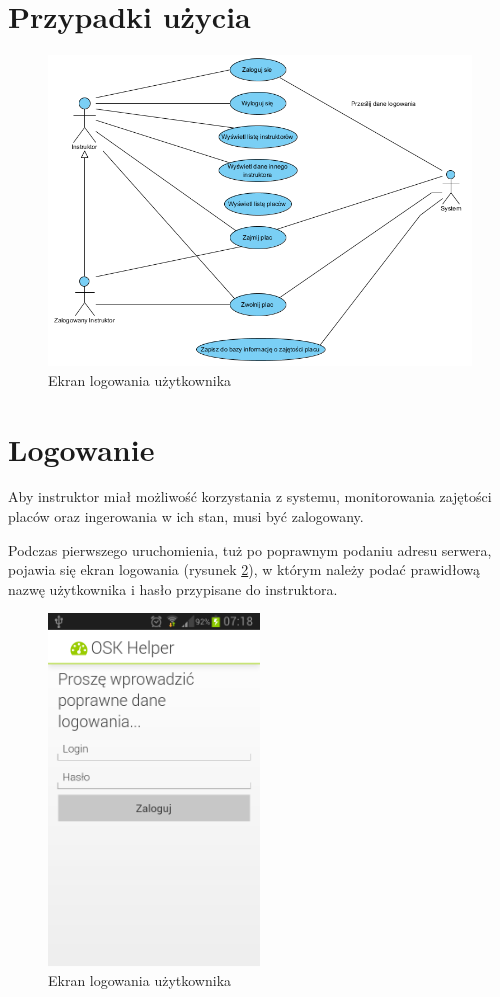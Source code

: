 \documentclass[twoside,a4paper,openright,12pt]{book}
\begin{document}
\section{Przypadki użycia}
\begin{figure}[H]
\centering
\includegraphics[width=1\textwidth]{screenshots/uml/usecases.png}
\caption{Ekran logowania użytkownika}
\label{fig:Diagram przypadków użycia}
\end{figure}


\section{Logowanie}
Aby instruktor miał możliwość korzystania z systemu, monitorowania zajętości placów oraz ingerowania w ich stan, musi być zalogowany.

Podczas pierwszego uruchomienia, tuż po poprawnym podaniu adresu serwera, pojawia się ekran logowania (rysunek \ref{fig:Logowanie_mobile}), w którym należy podać prawidłową nazwę użytkownika i hasło przypisane do instruktora.

\begin{figure}[H]
\centering
\includegraphics[width=0.5\textwidth]{screenshots/android/logowanie.png}
\caption{Ekran logowania użytkownika}
\label{fig:Logowanie_mobile}
\end{figure}
\end{document}
